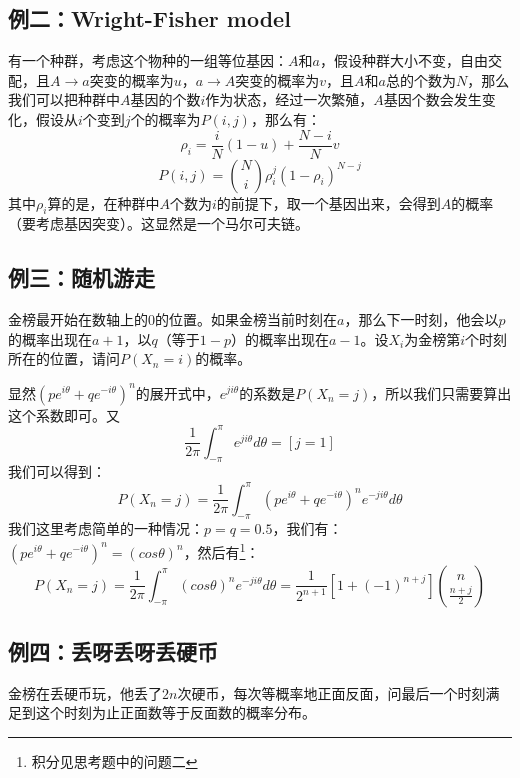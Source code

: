 		\subsection{例二：Wright-Fisher model}
		有一个种群，考虑这个物种的一组等位基因：$A$和$a$，假设种群大小不变，自由交配，且$A\rightarrow a$突变的概率为$u$，$a\rightarrow A$突变的概率为$v$，且$A$和$a$总的个数为$N$，那么我们可以把种群中$A$基因的个数$i$作为状态，经过一次繁殖，$A$基因个数会发生变化，假设从$i$个变到$j$个的概率为$P(i,j)$，那么有：
		$$
			\rho_i = \frac{i}{N}(1-u)+\frac{N-i}{N}v
		$$
		$$
			P(i,j) = \binom{N}{i}\rho_i^j(1-\rho_i)^{N-j}
		$$
		其中$\rho_i$算的是，在种群中$A$个数为$i$的前提下，取一个基因出来，会得到$A$的概率（要考虑基因突变）。这显然是一个马尔可夫链。
		
		\subsection{例三：随机游走}
		金榜最开始在数轴上的$0$的位置。如果金榜当前时刻在$a$，那么下一时刻，他会以$p$的概率出现在$a+1$，以$q$（等于$1-p$）的概率出现在$a-1$。设$X_i$为金榜第$i$个时刻所在的位置，请问$P(X_n = i)$的概率。
		
		\proof 显然$(pe^{i\theta}+qe^{-i\theta})^n$的展开式中，$e^{ji\theta}$的系数是$P(X_n=j)$，所以我们只需要算出这个系数即可。又
		$$
		\frac{1}{2\pi}\int_{-\pi}^{\pi}e^{ji\theta}d\theta = [j = 1]
		$$
		我们可以得到：
		$$
			P(X_n=j) = \frac{1}{2\pi}\int_{-\pi}^{\pi}(pe^{i\theta}+qe^{-i\theta})^ne^{-ji\theta}d\theta
		$$
		我们这里考虑简单的一种情况：$p = q = 0.5$，我们有：$(pe^{i\theta}+qe^{-i\theta})^n = (cos\theta)^n$，然后有\footnote{积分见思考题中的问题二}：
		$$
			P(X_n=j) = \frac{1}{2\pi}\int_{-\pi}^{\pi}(cos\theta)^ne^{-ji\theta}d\theta = \frac{1}{2^{n+1}}[1+(-1)^{n+j}]\binom{n}{\frac{n+j}{2}}
		$$
		
		\subsection{例四：丢呀丢呀丢硬币}
		金榜在丢硬币玩，他丢了$2n$次硬币，每次等概率地正面反面，问最后一个时刻满足到这个时刻为止正面数等于反面数的概率分布。
		
